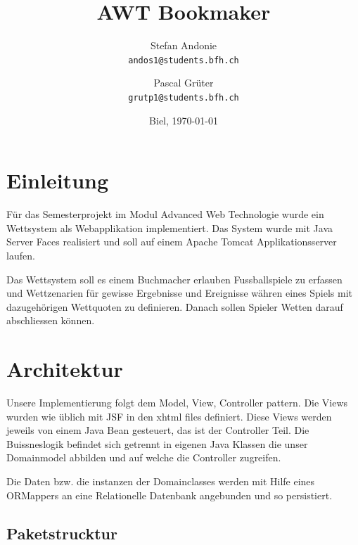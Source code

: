 \documentclass[a4paper, abstracton]{scrartcl}
\begin{document}
\title{\vspace{1cm}AWT Bookmaker \vspace{1cm}}
\author{
  Stefan Andonie\\
  \texttt{andos1@students.bfh.ch}
  \and
  Pascal Grüter\\
  \texttt{grutp1@students.bfh.ch}\vspace{1cm}
}

\date{Biel, \today}
\vspace{3cm}
\maketitle
\thispagestyle{titlepage}


\pagebreak

\section{Einleitung}
  
  Für das Semesterprojekt im Modul Advanced Web Technologie wurde ein Wettsystem
  als Webapplikation implementiert.
  Das System wurde mit Java Server Faces realisiert und soll auf einem Apache
  Tomcat Applikationsserver laufen.
  
  Das Wettsystem soll es einem Buchmacher erlauben Fussballspiele zu erfassen
  und Wettzenarien für gewisse Ergebnisse und Ereignisse währen eines Spiels mit
  dazugehörigen Wettquoten zu definieren.
  Danach sollen Spieler Wetten darauf abschliessen können.

\section{Architektur}

  Unsere Implementierung folgt dem Model, View, Controller pattern.
  Die Views wurden wie üblich mit JSF in den xhtml files definiert.
  Diese Views werden jeweils von einem Java Bean gesteuert, das ist der
  Controller Teil. Die Buissneslogik befindet sich getrennt in eigenen Java
  Klassen die unser Domainmodel abbilden und auf welche die Controller zugreifen.
  
  Die Daten bzw. die instanzen der Domainclasses werden mit Hilfe eines ORMappers
  an eine Relationelle Datenbank angebunden und so persistiert.

  \subsection{Paketstrucktur}
  
\end{document}
